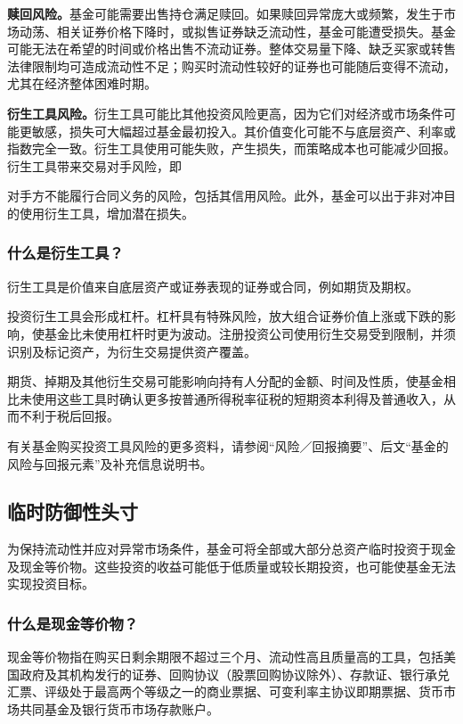 \documentclass[UTF8,fontset=none,11pt,a4paper]{ctexart}
\begin{document}
\textbf{赎回风险。}基金可能需要出售持仓满足赎回。如果赎回异常庞大或频繁，发生于市场动荡、相关证券价格下降时，或拟售证券缺乏流动性，基金可能遭受损失。基金可能无法在希望的时间或价格出售不流动证券。整体交易量下降、缺乏买家或转售法律限制均可造成流动性不足；购买时流动性较好的证券也可能随后变得不流动，尤其在经济整体\allowbreak\mbox{困难时期。}

\textbf{衍生工具风险。}衍生工具可能比其他投资风险更高，因为它们对经济或市场条件可能更敏感，损失可大幅超过基金最初投入。其价值变化可能不与底层资产、利率或指数完全一致。衍生工具使用可能失败，产生损失，而策略成本也可能减少回报。衍生工具带来交易对手风险，即

对手方不能履行合同义务的风险，包括其信用风险。此外，基金可以出于非对冲目的使用衍生工具，增加\allowbreak\mbox{潜在损失。}

\subsubsection*{什么是衍生工具？}
衍生工具是价值来自底层资产或证券表现的证券或合同，例如期\allowbreak\mbox{货及期权。}


投资衍生工具会形成杠杆。杠杆具有特殊风险，放大组合证券价值上涨或下跌的影响，使基金比未使用杠杆时更为波动。注册投资公司使用衍生交易受到限制，并须识别及标记资产，为衍生交易提供\allowbreak\mbox{资产覆盖。}

期货、掉期及其他衍生交易可能影响向持有人分配的金额、时间及性质，使基金相比未使用这些工具时确认更多按普通所得税率征税的短期资本利得及普通收入，从而不利于\allowbreak\mbox{税后回报。}

有关基金购买投资工具风险的更多资料，请参阅“风险／回报摘要”、后文“基金的风险与回报元素”及补充信\allowbreak\mbox{息说明书。}

\subsection*{临时防御性头寸}\label{unitU278}
为保持流动性并应对异常市场条件，基金可将全部或大部分总资产临时投资于现金及现金等价物。这些投资的收益可能低于低质量或较长期投资，也可能使基金无法实现\allowbreak\mbox{投资目标。}

\subsubsection*{什么是现金等价物？}
现金等价物指在购买日剩余期限不超过三个月、流动性高且质量高的工具，包括美国政府及其机构发行的证券、回购协议（股票回购协议除外）、存款证、银行承兑汇票、评级处于最高两个等级之一的商业票据、可变利率主协议即期票据、货币市场共同基金及银行货币市场\allowbreak\mbox{存款账户。}
\end{document}
